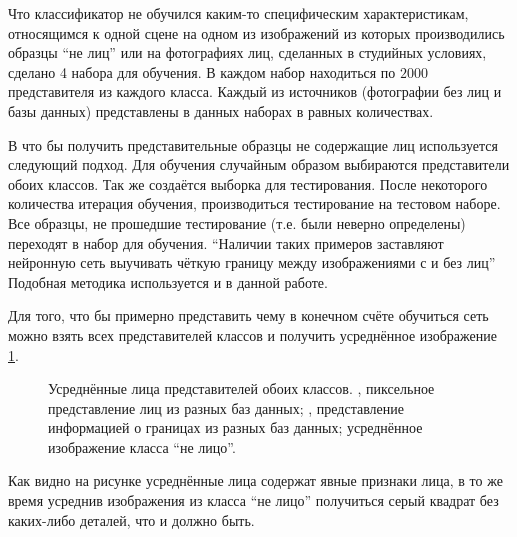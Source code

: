 \documentclass[12pt]{report}
\begin{document}
Что классификатор не обучился каким-то специфическим характеристикам, относящимся к одной сцене на одном из 
изображений из которых производились образцы ``не лиц'' или на фотографиях лиц, сделанных в студийных условиях, 
сделано 4 набора для обучения. В каждом набор находиться по $2 000$ представителя из каждого класса. Каждый из 
источников (фотографии без лиц и базы данных) представлены в данных наборах в равных количествах.

В \citep{rowley1998neural} что бы получить представительные образцы не содержащие лиц используется следующий 
подход. 
Для обучения случайным образом выбираются представители обоих классов. Так же создаётся выборка для тестирования. 
После некоторого количества итерация обучения, производиться тестирование на тестовом наборе. Все образцы, не 
прошедшие тестирование (т.е. были неверно определены) переходят в набор для обучения. ``Наличии таких примеров 
заставляют нейронную сеть выучивать чёткую границу между изображениями с и без лиц'' \citep{rowley1998neural} 
Подобная методика используется и в данной работе.

Для того, что бы примерно представить чему в конечном счёте обучиться сеть можно взять всех представителей классов 
и 
получить усреднённое изображение \ref{fig:avg_faces}.

\begin{figure}[h]
	\centering
	\caption{Усреднённые лица представителей обоих классов. ,  
пиксельное представление лиц из разных баз данных; ,  
представление информацией о границах из разных баз данных;  усреднённое изображение класса 
``не лицо''.}
	\label{fig:avg_faces}
\end{figure}
Как видно на рисунке усреднённые лица содержат явные признаки лица, в то же время усреднив изображения из класса 
``не 
лицо'' получиться серый квадрат без каких-либо деталей, что и должно быть.
\end{document}
